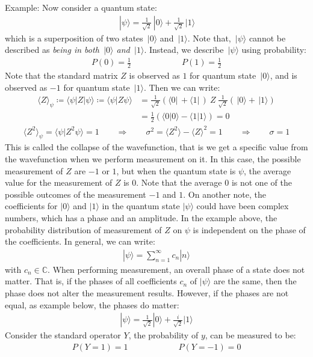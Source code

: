 \documentclass[11pt]{book}
\theoremstyle{break}
\theoremstyle{break}
\newcommand{\C}{\mathbb{C}}
\newcommand{\ket}[1]{\,| #1 \rangle}
\newcommand{\bra}[1]{\langle #1 |\,}
\newcommand{\example}{\color{green}Example: \color{black}}
\begin{document}
\example Now consider a quantum state:
\begin{align*}
\ket{\psi} = \frac{1}{\sqrt{2}}\ket{0} + \frac{1}{\sqrt{2}}\ket{1}
\end{align*}
which is a superposition of two states $\ket{0}$ and $\ket{1}$. Note that, $\ket{\psi}$ cannot be described as \textit{being in both $\ket{0}$ and $\ket{1}$}. Instead, we describe $\ket{\psi}$ using probability:
\begin{align*}
P(0) = \frac{1}{2} \qquad\qquad\qquad P(1) = \frac{1}{2}
\end{align*}
Note that the standard matrix $Z$ is observed as $1$ for quantum state $\ket{0}$, and is observed as $-1$ for quantum state $\ket{1}$. Then we can write:
\begin{align*}
\langle Z\rangle_\psi \coloneqq \langle \psi | Z | \psi\rangle  \coloneqq \langle \psi | Z\psi \rangle 
&= \frac{1}{\sqrt{2}}(\bra{0} + \bra{1} ) \ Z \ \frac{1}{\sqrt{2}}(\ket{0} + \ket{1})\\
&= \frac{1}{2}(\langle 0 | 0 \rangle - \langle 1 | 1 \rangle) = 0
\end{align*}
\begin{align*}
\langle Z^2\rangle_\psi = \langle \psi |Z^2 \psi\rangle = 1 \qquad \Rightarrow \qquad \sigma^2 = \langle Z^2 \rangle - \langle Z\rangle^2 = 1 \qquad \Rightarrow \qquad \sigma = 1
\end{align*}
This is called the collapse of the wavefunction, that is we get a specific value from the wavefunction when we perform measurement on it. In this case, the possible measurement of $Z$ are $-1$ or $1$, but when the quantum state is $\psi$, the average value for the measurement of $Z$ is $0$. Note that the average $0$ is not one of the possible outcomes of the measurement $-1$ and $1$. On another note, the coefficients for $|0\rangle$ and $|1\rangle$ in the quantum state $|\psi\rangle$ could have been complex numbers, which has a phase and an amplitude. In the example above, the probability distribution of measurement of $Z$ on $\psi$ is independent on the phase of the coefficients. In general, we can write:
\begin{align*}
|\psi\rangle  = \sum_{n=1}^\infty c_n |n\rangle
\end{align*}
with $c_n\in \C$. When performing measurement, an overall phase of a state does not matter. That is, if the phases of all coefficients $c_n$ of $|\psi\rangle$ are the same, then the phase does not alter the measurement results. However, if the phases are not equal, as example below, the phases do matter:
\begin{align*}
|\psi\rangle = \frac{1}{\sqrt{2}}|0\rangle + \frac{i}{\sqrt{2}}|1\rangle
\end{align*}
Consider the standard operator $Y$, the probability of $y$, can be measured to be:
\begin{align*}
P(Y=1) = 1\qquad\qquad\qquad P(Y=-1) = 0
\end{align*}
\end{document}
